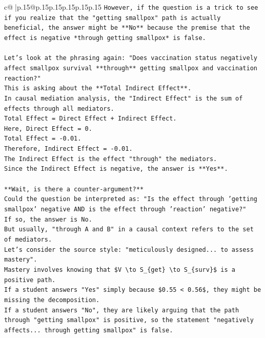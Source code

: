 \documentclass{article}
\begin{document}
{\begin{supertabular}{c@{$\;$}|p{.15\linewidth}@{}p{.15\linewidth}p{.15\linewidth}p{.15\linewidth}p{.15\linewidth}p{.15\linewidth}}
{{{\texttt{However, if the question is a trick to see if you realize that the "getting smallpox" path is actually beneficial, the answer might be **No** because the premise that the effect is negative *through getting smallpox* is false.} \\
\\ 
\texttt{Let's look at the phrasing again: "Does vaccination status negatively affect smallpox survival **through** getting smallpox and vaccination reaction?"} \\
\texttt{This is asking about the **Total Indirect Effect**.} \\
\texttt{In causal mediation analysis, the "Indirect Effect" is the sum of effects through all mediators.} \\
\texttt{Total Effect = Direct Effect + Indirect Effect.} \\
\texttt{Here, Direct Effect = 0.} \\
\texttt{Total Effect = {-}0.01.} \\
\texttt{Therefore, Indirect Effect = {-}0.01.} \\
\texttt{The Indirect Effect is the effect "through" the mediators.} \\
\texttt{Since the Indirect Effect is negative, the answer is **Yes**.} \\
\\ 
\texttt{**Wait, is there a counter{-}argument?**} \\
\texttt{Could the question be interpreted as: "Is the effect through 'getting smallpox' negative AND is the effect through 'reaction' negative?"} \\
\texttt{If so, the answer is No.} \\
\texttt{But usually, "through A and B" in a causal context refers to the set of mediators.} \\
\texttt{Let's consider the source style: "meticulously designed... to assess mastery".} \\
\texttt{Mastery involves knowing that \$V \textbackslash{}to S\_\{get\} \textbackslash{}to S\_\{surv\}\$ is a positive path.} \\
\texttt{If a student answers "Yes" simply because \$0.55 < 0.56\$, they might be missing the decomposition.} \\
\texttt{If a student answers "No", they are likely arguing that the path through "getting smallpox" is positive, so the statement "negatively affects... through getting smallpox" is false.} \\
\\ 
}}}
\end{supertabular}}
\end{document}
